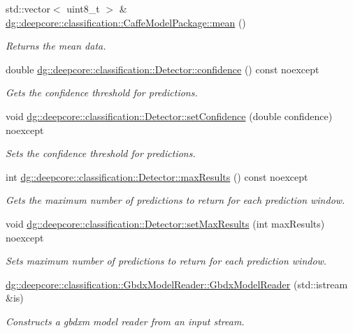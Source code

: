 \begin{DoxyCompactItemize}
std\+::vector$<$ uint8\+\_\+t $>$ \& \hyperlink{group___classification_module_ga992d98f0f066f15edc2dfb40c03a3a88}{dg\+::deepcore\+::classification\+::\+Caffe\+Model\+Package\+::mean} ()
\begin{DoxyCompactList}\small\item\em Returns the mean data. \end{DoxyCompactList}\item 
double \hyperlink{group___classification_module_ga11004d28f6b88023d1ae1bed44261dc9}{dg\+::deepcore\+::classification\+::\+Detector\+::confidence} () const noexcept
\begin{DoxyCompactList}\small\item\em Gets the confidence threshold for predictions. \end{DoxyCompactList}\item 
void \hyperlink{group___classification_module_ga870a49fe3273eacfea12e38aa8360f6f}{dg\+::deepcore\+::classification\+::\+Detector\+::set\+Confidence} (double confidence) noexcept
\begin{DoxyCompactList}\small\item\em Sets the confidence threshold for predictions. \end{DoxyCompactList}\item 
int \hyperlink{group___classification_module_gae2a1d191924996f7d3d0673b8c2da35d}{dg\+::deepcore\+::classification\+::\+Detector\+::max\+Results} () const noexcept
\begin{DoxyCompactList}\small\item\em Gets the maximum number of predictions to return for each prediction window. \end{DoxyCompactList}\item 
void \hyperlink{group___classification_module_ga936252ea1133d7c0c2a42ba0afbc2cf0}{dg\+::deepcore\+::classification\+::\+Detector\+::set\+Max\+Results} (int max\+Results) noexcept
\begin{DoxyCompactList}\small\item\em Sets maximum number of predictions to return for each prediction window. \end{DoxyCompactList}\item 
\hyperlink{group___classification_module_gaf76d6b5a7aedc2124731adf9e3858853}{dg\+::deepcore\+::classification\+::\+Gbdx\+Model\+Reader\+::\+Gbdx\+Model\+Reader} (std\+::istream \&is)
\begin{DoxyCompactList}\small\item\em Constructs a gbdxm model reader from an input stream. \end{DoxyCompactList}\item 

\end{DoxyCompactItemize}
